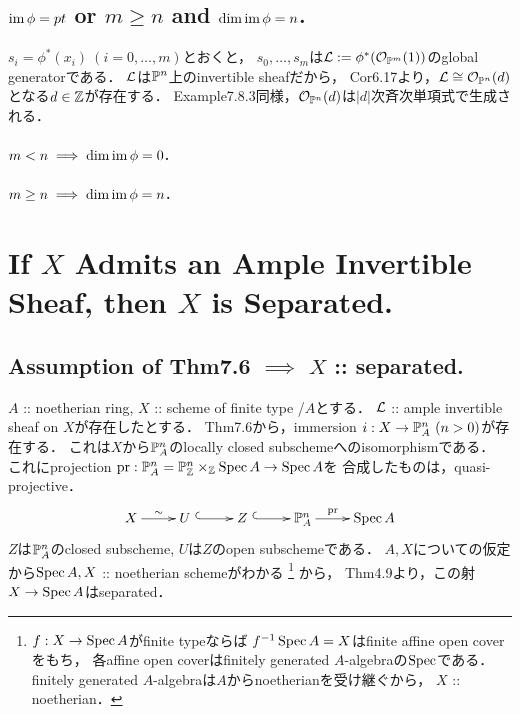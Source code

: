 \documentclass[a4paper]{jsarticle}
\begin{document}
    \subsection{$\operatorname{im} \phi=pt$ or $m \geq n$ and $\dim \operatorname{im} \phi=n$.}
    $s_i=\phi^*(x_i)~(i=0,\dots,m)$とおくと，
    $s_0,\dots,s_m$は$\mathcal{L}:=\phi^*(\mathcal{O}_{\mathbb{P}^m}(1))$のglobal generatorである．
    $\mathcal{L}$は$\mathbb{P}^n$上のinvertible sheafだから，
    Cor6.17より，$\mathcal{L} \cong \mathcal{O}_{\mathbb{P}^n}(d)$となる$d \in \mathbb{Z}$が存在する．
    Example7.8.3同様，$\mathcal{O}_{\mathbb{P}^n}(d)$は$|d|$次斉次単項式で生成される．

    \paragraph{$m<n \implies \dim \operatorname{im} \phi=0$.}
    \paragraph{$m \geq n \implies \dim \operatorname{im} \phi=n$.}

\section{If $X$ Admits an Ample Invertible Sheaf, then $X$ is Separated.} %
    \subsection{Assumption of Thm7.6 $\implies$ $X$ :: separated.}
    $A$ :: noetherian ring,
    $X$ :: scheme of finite type /$A$とする．
    $\mathcal{L}$ :: ample invertible sheaf on $X$が存在したとする．
    Thm7.6から，immersion $i: X \to \mathbb{P}^n_A ~(n>0)$が存在する．
    これは$X$から$\mathbb{P}^n_A$のlocally closed subschemeへのisomorphismである．
    これにprojection $\operatorname{pr}: \mathbb{P}^n_A=\mathbb{P}^n_{\mathbb{Z}} \times_{\mathbb{Z}} \operatorname{Spec} A \to \operatorname{Spec} A$を
    合成したものは，quasi-projective．
    \[\xymatrix
    {
        X \ar[r]^-{\sim}& U ~\ar@{^{(}->}[r]& Z ~\ar@{^{(}->}[r]& \proj^n_A \ar[r]^-{\pr}& \Spec A
    }\]
    $Z$は$\mathbb{P}^n_A$のclosed subscheme,
    $U$は$Z$のopen subschemeである．
    $A,X$についての仮定から$\operatorname{Spec} A, X$ :: noetherian schemeがわかる
    \footnote
    {
        $f: X \to \operatorname{Spec} A$がfinite typeならば
        $f^{-1}\operatorname{Spec} A=X$はfinite affine open coverをもち，
        各affine open coverはfinitely generated $A$-algebraの$\operatorname{Spec}$である．
        finitely generated $A$-algebraは$A$からnoetherianを受け継ぐから，
        $X$ :: noetherian．
    }
    から，
    Thm4.9より，この射$X \to \operatorname{Spec} A$はseparated．
    
\end{document}
